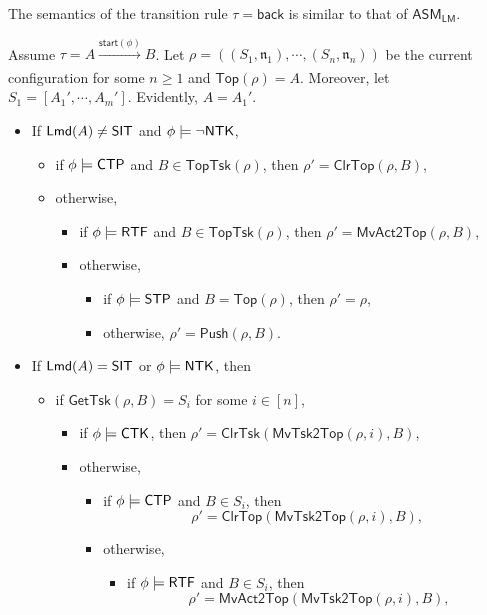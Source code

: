 \documentclass[preprint,12pt]{elsarticle}
\newcommand\lmd{{\sf Lmd}}
\newcommand\standard{{\sf STD}}
\newcommand\singleinstance{{\sf SIT}}
\newcommand\ntkflag{{\sf NTK}}
\newcommand\ctpflag{{\sf CTP}}
\newcommand\stpflag{{\sf STP}}
\newcommand\ctkflag{{\sf CTK}}
\newcommand\rtfflag{{\sf RTF}}
\newcommand{\LMAMASS}{\textsf{ASM}_\textsf{LM}}
\newcommand\back{{\mathsf{back} }}
\newcommand\startactivity{{\mathsf{start} }}
\newcommand\aname{\mathfrak{n}}
\newcommand\toptsk{\mathsf{TopTsk}}
\newcommand\topact{\mathsf{Top}}
\newcommand\push{\mathsf{Push}}
\newcommand\mvacttop{\mathsf{MvAct2Top}}
\newcommand\clrtop{\mathsf{ClrTop}}
\newcommand\clrtsk{\mathsf{ClrTsk}}
\newcommand\mvtsktop{\mathsf{MvTsk2Top}}
\newcommand\gettsk{\mathsf{GetTsk}}
\begin{document}
The semantics of the transition rule $\tau = \back$ is similar to that of $\LMAMASS$.

Assume $\tau = A\xrightarrow[]{\startactivity(\phi)}B$.
%
Let $\rho = ((S_1,\aname_1),\cdots,(S_n,\aname_n))$ be the current configuration for some $n \ge 1$ and $\topact(\rho) = A$. Moreover, let $S_1 = [A_1',\cdots,A_m']$. Evidently, $A = A_1'$.

\medskip

\noindent \fbox{\fbox{$\lmd(B) = \standard$}}
\begin{itemize}
	\item If $\lmd(A) \neq \singleinstance$ and $\phi \models \neg \ntkflag$, 
	\begin{itemize}
		\item if $\phi \models\ctpflag$ and $B \in \toptsk(\rho)$, then $\rho' =\clrtop(\rho, B)$,
		\item otherwise,
		\begin{itemize}
			\item if $\phi \models \rtfflag$ and $B \in \toptsk(\rho)$, then $\rho'=\mvacttop(\rho, B)$,
			\item otherwise,
			\begin{itemize}
				\item if $\phi \models \stpflag$ and $B = \topact(\rho)$, then $\rho' = \rho$,
				\item otherwise, $\rho' = \push(\rho, B)$.
			\end{itemize}
		\end{itemize}
	\end{itemize}
	\item If $\lmd(A) = \singleinstance$ or $\phi \models \ntkflag$, then
	\begin{itemize}
		\item if $\gettsk(\rho, B) = S_i$ for some $i\in[n]$,
		\begin{itemize}
			\item if $\phi \models\ctkflag$, then $\rho' = \clrtsk(\mvtsktop(\rho, i), B)$,
			\item otherwise, 
			\begin{itemize}
				\item if $\phi \models \ctpflag$ and $B \in S_i$, then 
				$$\rho' =\clrtop(\mvtsktop(\rho, i), B),$$
				\item otherwise,
				\begin{itemize}
					\item if $\phi \models \rtfflag$ and $B \in S_i$, then 
					$$\rho'=\mvacttop(\mvtsktop(\rho, i), B),$$

\end{itemize}
\end{itemize}
\end{itemize}
\end{itemize}
\end{itemize}
\end{document}
